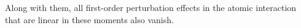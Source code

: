 Along with them, all first-order perturbation effects in the atomic interaction that are linear in these moments also vanish.
